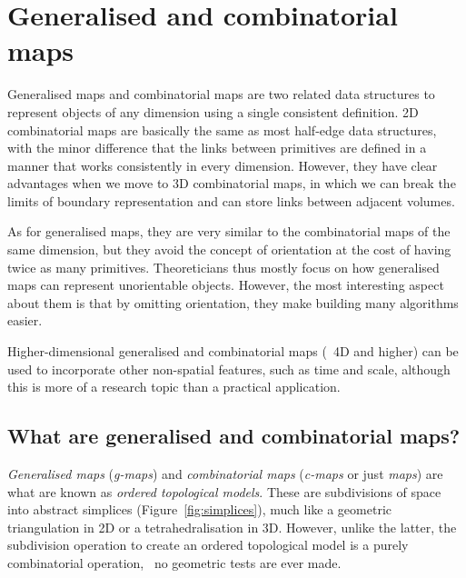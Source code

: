 
\setchapterpreamble[u]{\margintoc}

\graphicspath{{gmaps/}}
\renewcommand*{\thelesson}{4.2}

\chapter{Generalised and combinatorial maps}%
\label{chap:gmaps}

Generalised maps and combinatorial maps are two related data structures to represent objects of any dimension using a single consistent definition.
2D combinatorial maps are basically the same as most half-edge data structures, with the minor difference that the links between primitives are defined in a manner that works consistently in every dimension.
However, they have clear advantages when we move to 3D combinatorial maps, in which we can break the limits of boundary representation and can store links between adjacent volumes.

As for generalised maps, they are very similar to the combinatorial maps of the same dimension, but they avoid the concept of orientation at the cost of having twice as many primitives.
Theoreticians thus mostly focus on how generalised maps can represent unorientable objects.
However, the most interesting aspect about them is that by omitting orientation, they make building many algorithms easier.

Higher-dimensional generalised and combinatorial maps (\ie\ 4D and higher) can be used to incorporate other non-spatial features, such as time and scale, although this is more of a research topic than a practical application.

\section{What are generalised and combinatorial maps?}

\emph{Generalised maps} (\emph{g-maps}) and \emph{combinatorial maps} (\emph{c-maps} or just \emph{maps}) are what are known as \emph{ordered topological models}.
These are subdivisions of space into abstract simplices (Figure~\ref{fig:simplices}), much like a geometric triangulation in 2D or a tetrahedralisation in 3D.
However, unlike the latter, the subdivision operation to create an ordered topological model is a purely combinatorial operation, \ie\ no geometric tests are ever made.

